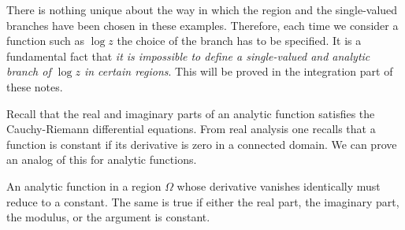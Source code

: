 There is nothing unique about the way in which the region and the single-valued branches have been chosen in these examples. Therefore, each time we consider a function such as $\log z$ the choice of the branch has to be specified. It is a fundamental fact that \textit{it is impossible to define a single-valued and analytic branch of $\log z$ in certain regions}. This will be proved in the integration part of these notes.

Recall that the real and imaginary parts of an analytic function satisfies the Cauchy-Riemann differential equations. From real analysis one recalls that a function is constant if its derivative is zero in a connected domain. We can prove an analog of this for analytic functions.

\begin{theorem}
	An analytic function in a region $\Omega$ whose derivative vanishes identically must reduce to a constant. The same is true if either the real part, the imaginary part, the modulus, or the argument is constant.
\end{theorem}

